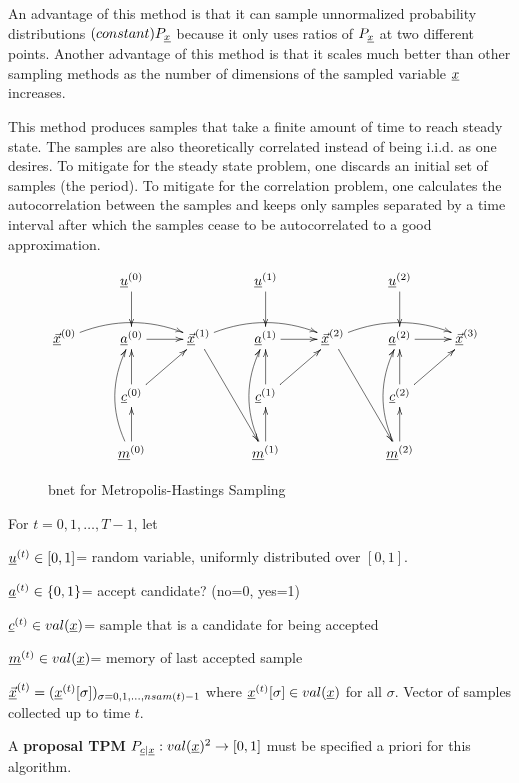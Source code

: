 An advantage of this method is that it can sample
unnormalized probability distributions
$(constant)P_\rvx$ 
because it 
only uses ratios of
$P_\rvx$ at two different points.
Another advantage
of this method
is that it scales much 
better than other sampling
methods as the number
of dimensions of the
sampled variable $\rvx$
increases.

This method produces samples that 
take a finite amount of
time to reach steady state. The samples
are also
theoretically correlated instead
of being i.i.d. as one desires.
To mitigate for the steady state problem,
one discards an initial set
of samples (the  period).
To mitigate for the correlation problem,
one calculates the autocorrelation
between the samples
and keeps only samples separated
by a time interval 
after which the samples 
cease to be autocorrelated to
a good approximation.



\begin{figure}[h!]
$$\xymatrix{
&\rvu^{(0)}\ar[d]
&&\rvu^{(1)}\ar[d]
&&\rvu^{(2)}\ar[d]
\\
\ul{\vecx}^{(0)}\ar@/^1pc/[rr]
&\rva^{(0)}\ar[r]
&
\ul{\vecx}^{(1)}\ar@/^1pc/[rr]\ar[rdd]
&\rva^{(1)}\ar[r]
&
\ul{\vecx}^{(2)}\ar@/^1pc/[rr]\ar[rdd]
&\rva^{(2)}\ar[r]
&\ul{\vecx}^{(3)}
\\
&\rvc^{(0)}\ar[u]\ar[ru]
&&\rvc^{(1)}\ar[u]\ar[ru]
&&\rvc^{(2)}\ar[u]\ar[ru]
\\
&\rvm^{(0)}\ar[u]\ar@/^1pc/[uu]
&&\rvm^{(1)}\ar[u]\ar@/^1pc/[uu]
&&\rvm^{(2)}\ar[u]\ar@/^1pc/[uu]
}$$
\caption{bnet for Metropolis-Hastings Sampling}
\label{fig-mcmc-metro-bnet}
\end{figure}

For $t=0, 1, \dots, T-1$, let

$\rvu^{(t)}\in [0,1]$= random variable,
uniformly
distributed over $[0,1]$.

$\rva^{(t)}\in \bool$= accept candidate? (no=0, yes=1)

$\rvc^{(t)}\in val(\rvx)$= sample that is a
candidate for being accepted

$\rvm^{(t)}\in val(\rvx)$= memory
of last accepted sample

$\ul{\vecx}^{(t)}=(\rvx^{(t)}[\sigma])_{\sigma=0,1, 
\ldots, nsam(t)-1}$
where $\rvx^{(t)}[\sigma] \in val(\rvx)$ for all $\sigma$.
Vector of samples collected 
up to time $t$.

A {\bf proposal TPM}
$P_{\rvc|\rvx}:val(\rvx)^2\rarrow [0,1]$
must be specified a priori 
for this algorithm.

